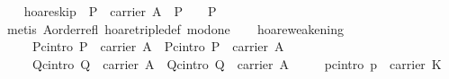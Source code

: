 \begin{isabellebody}
\isanewline
\ \ \isamarkupfalse%
\ hoare{}skip{}\ \ {}P\ {}\ carrier\ A\ {}\ P\ {}\ {}\ {}\ P{}\isanewline
%
\isadelimproof
\ \ \ \ %
\endisadelimproof
%
\isatagproof
{}\isamarkupfalse%
\ {}metis\ A{}order{}refl\ hoare{}triple{}def\ mod{}one{}%
\endisatagproof
{\isafoldproof}%
%
\isadelimproof
\isanewline
%
\endisadelimproof
\isanewline
\ \ \isamarkupfalse%
\ hoare{}weakening{}\isanewline
\ \ \ \ \ Pc{}intro{}{}\ {}P\ {}\ carrier\ A{}\ \ P{}c{}intro{}{}\ {}P{}\ {}\ carrier\ A{}\isanewline
\ \ \ \ \ Qc{}intro{}{}\ {}Q\ {}\ carrier\ A{}\ \ Q{}c{}intro{}{}\ {}Q{}\ {}\ carrier\ A{}\isanewline
\ \ \ \ \ pc{}intro{}{}\ {}p\ {}\ carrier\ K{}\isanewline

\end{isabellebody}
